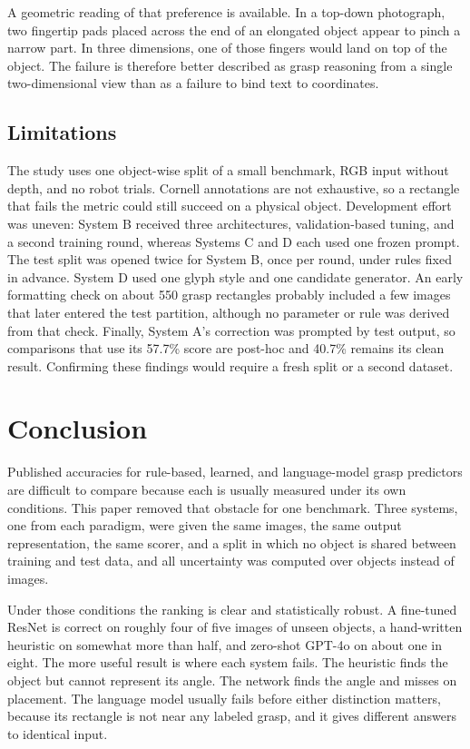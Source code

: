 \documentclass[10pt,conference,compsoc]{IEEEtran}
\begin{document}
A geometric reading of that preference is available. In a top-down
photograph, two fingertip pads placed across the end of an elongated object
appear to pinch a narrow part. In three dimensions, one of those fingers
would land on top of the object. The failure is therefore better described
as grasp reasoning from a single two-dimensional view than as a failure to
bind text to coordinates.

\subsection{Limitations}

The study uses one object-wise split of a small benchmark, RGB input without
depth, and no robot trials. Cornell annotations are not exhaustive, so a
rectangle that fails the metric could still succeed on a physical object.
Development effort was uneven: System B received three architectures,
validation-based tuning, and a second training round, whereas Systems C and D
each used one frozen prompt. The test split was opened twice for System B,
once per round, under rules fixed in advance. System D used one glyph style
and one candidate generator. An early formatting check on about 550 grasp
rectangles probably included a few images that later entered the test
partition, although no parameter or rule was derived from that check.
Finally, System A's correction was prompted by test output, so comparisons
that use its 57.7\% score are post-hoc and 40.7\% remains its clean result.
Confirming these findings would require a fresh split or a second dataset.

\section{Conclusion}

Published accuracies for rule-based, learned, and language-model grasp
predictors are difficult to compare because each is usually measured under
its own conditions. This paper removed that obstacle for one benchmark. Three
systems, one from each paradigm, were given the same images, the same output
representation, the same scorer, and a split in which no object is shared
between training and test data, and all uncertainty was computed over
objects instead of images.

Under those conditions the ranking is clear and statistically robust. A
fine-tuned ResNet is correct on roughly four of five images of unseen objects,
a hand-written heuristic on somewhat more than half, and zero-shot GPT-4o on
about one in eight. The more useful result is where each system fails. The
heuristic finds the object but cannot represent its angle. The network finds
the angle and misses on placement. The language model usually fails before
either distinction matters, because its rectangle is not near any labeled
grasp, and it gives different answers to identical input.
\end{document}
